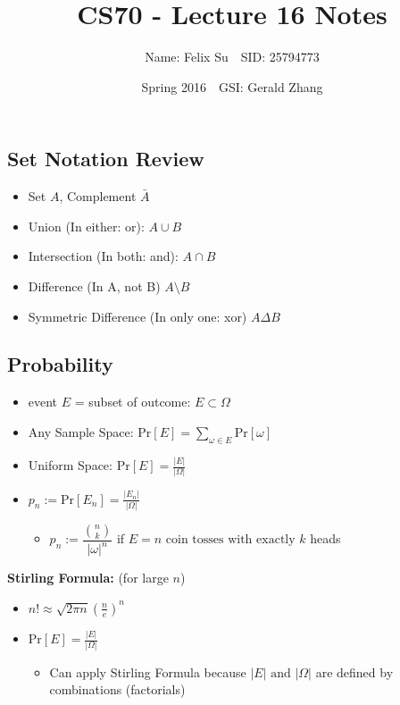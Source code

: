 \documentclass{article}\usepackage{amsmath,amssymb,amsthm,tikz,tkz-graph,color,chngpage,soul,hyperref,csquotes,graphicx,floatrow, listings}\newcommand*{\QEDB}{\hfill\ensuremath{\square}}\newtheorem*{prop}{Proposition}\renewcommand{\theenumi}{\alph{enumi}}\usepackage[shortlabels]{enumitem}\usepackage[nobreak=true]{mdframed}\usetikzlibrary{matrix,calc}\MakeOuterQuote{"}\usepackage[margin=0.75in]{geometry} \newtheorem{theorem}{Theorem}\newcommand{\Z}{\mathbb Z}\newcommand{\R}{\mathbb R}\newcommand{\Q}{\mathbb Q}\newcommand{\N}{\mathbb N}\newcommand{\x}[1]{\textrm{ #1 }}\newcommand{\pr}{\textrm{Pr}}
\title{CS70 - Lecture 16 Notes}
\author{Name: Felix Su$\quad$SID: 25794773}
\date{Spring 2016$\quad$GSI: Gerald Zhang}
\begin{document}
\maketitle

\subsection*{Set Notation Review}
\begin{itemize}
    \item Set $A$, Complement $\bar{A}$
    \item Union (In either: or): $A \cup B$
    \item Intersection (In both: and): $A \cap B$
    \item Difference (In A, not B) $A \setminus B$
    \item Symmetric Difference (In only one: xor) $A \Delta B$
\end{itemize}
\subsection*{Probability}
\begin{itemize}
    \item event $E$ = subset of outcome: $E \subset \Omega$
    \item Any Sample Space: $\pr[E]=\sum\limits_{\omega \in E}\pr[\omega]$
    \item Uniform Space: $\pr[E]=\frac{|E|}{|\Omega|}$
    \item $p_n := \pr[E_n]=\frac{|E_n|}{|\Omega|}$
    \begin{itemize}
        \item $p_n := \dfrac{\binom{n}{k}}{|\omega|^{n}}$ if $E = n \x{coin tosses with exactly} k$ heads 
    \end{itemize}
\end{itemize}
\begin{mdframed}
\textbf{Stirling Formula:} (for large $n$)
\begin{itemize}
    \item $n! \approx \sqrt{2\pi n}(\frac{n}{e})^n$
    \item $\pr[E]=\frac{|E|}{|\Omega|}$
    \begin{itemize}
        \item Can apply Stirling Formula because $|E| \x{and} |\Omega|$ are defined by combinations (factorials)
    \end{itemize}
\end{itemize}
\end{mdframed}
\end{document}
